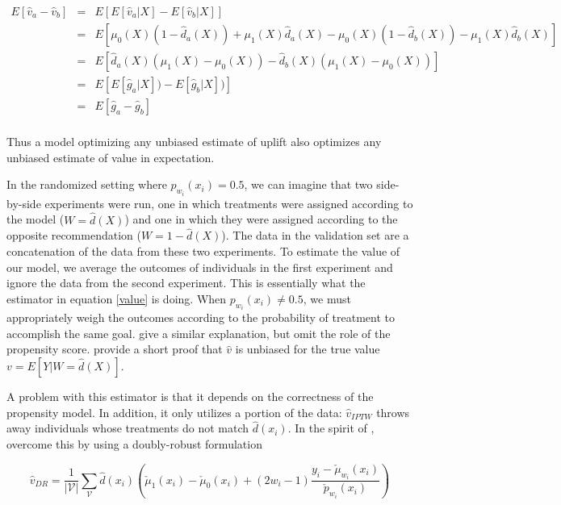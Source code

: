 {\[
\begin{array}{rcl}
E[\hat v_a - \hat v_b] 

& = & E[E[\hat v_a | X] - E[\hat v_b|X]] \\

&=& E \left[
	\mu_0(X)(1-\hat d_a(X)) + \mu_1(X)\hat d_a(X) 
      - \mu_0(X)(1-\hat d_b(X)) -  \mu_1(X)\hat d_b(X)
\right] \\

&=& E \left[
	  \hat d_a(X) (\mu_1(X)  - \mu_0(X) ) 
	- \hat d_b(X) (\mu_1(X)  - \mu_0(X) )
\right] \\

&=& E \left[
	  E[\hat g_a | X] ) 
	- E[\hat g_b | X] )
\right] \\

&=& E \left[ \hat g_a - \hat g_b \right] \\
\end{array}
\]

Thus a model optimizing any unbiased estimate of uplift also optimizes any unbiased estimate of value in expectation.
}

In the randomized setting where $p_{w_i}(x_i) = 0.5$, we can imagine that two side-by-side experiments were run, one in which treatments were assigned according to the model ($W = \hat d(X)$) and one in which they were assigned according to the opposite recommendation ($W = 1 - \hat d(X)$). The data in the validation set are a concatenation of the data from these two experiments. To estimate the value of our model, we average the outcomes of individuals in the first experiment and ignore the data from the second experiment. This is essentially what the estimator in equation \ref{value} is doing. When $p_{w_i}(x_i) \ne 0.5$, we must appropriately weigh the outcomes according to the probability of treatment to accomplish the same goal. \citet{Kapelner:3baXYEjR} give a similar explanation, but omit the role of the propensity score. \citet{Zhao:2017wa} provide a short proof that $\hat v$ is unbiased for the true value $v = E[Y|W = \hat d(X)]$. 

A problem with this estimator is that it depends on the correctness of the propensity model. In addition, it only utilizes a portion of the data: $\hat v_{IPTW}$ throws away individuals whose treatments do not match $\hat d(x_i)$. In the spirit of \citet{Dudik:tn}, \citet{Athey:wj} overcome this by using a doubly-robust formulation

\begin{equation}
	\hat v_{DR} = \frac{1}{|\mathcal{V}|}\sum_{\mathcal{V}}
	\hat d(x_i)
	\left(
	\check\mu_1(x_i) - \check\mu_0(x_i)+ (2w_i -1)\frac{y_i - \check\mu_{w_i}(x_i)}{\check p_{w_i}(x_i)}
	\right)
\label{value-dr}
\end{equation}

